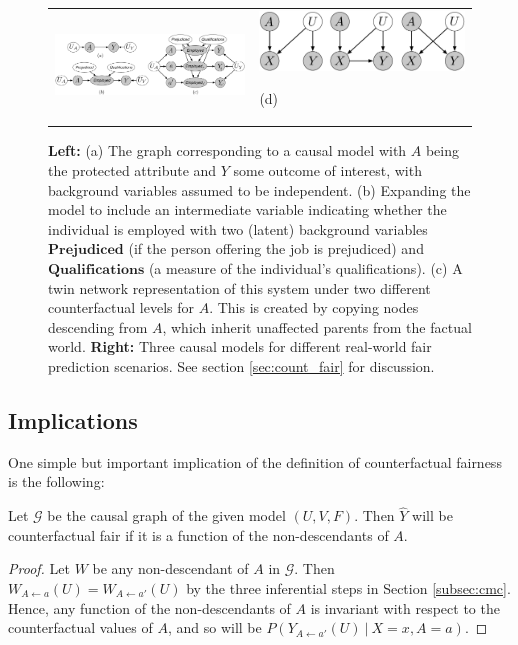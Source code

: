 \begin{figure}
  \begin{tabular}{p{}|p{}}
    \centerline{\includegraphics[width=0.5\columnwidth]{implications_fig.pdf}}&
    \centerline{\includegraphics[width=0.5\columnwidth]{simple_models_no_q3}}(d)
  \end{tabular}
  \caption{\label{fig:ex1} {\bf Left:} (a) The graph corresponding to
    a causal model with $A$ being the protected attribute and $Y$ some
    outcome of interest, with background variables assumed to be
    independent.  (b) Expanding the model to include an intermediate
    variable indicating whether the individual is employed with two
    (latent) background variables $\textbf{Prejudiced}$ (if the person
    offering the job is prejudiced) and $\textbf{Qualifications}$ (a
    measure of the individual's qualifications). (c) A twin network
    representation of this system \citep{pearl:00} under two different
    counterfactual levels for $A$. This is created by copying nodes
    descending from $A$, which inherit unaffected parents from the
    factual world. {\bf Right:} Three causal models for different
    real-world fair prediction scenarios.\label{figure.simple_models}
    See section \ref{sec:count_fair} for discussion.}
\end{figure}

\subsection{Implications}
%
One simple but important implication of the definition of counterfactual fairness is the following:
%
\begin{lem}
  Let $\mathcal G$ be the causal graph of the given model $(U, V, F)$.
  Then $\hat Y$ will be counterfactual fair if it is a function
  of the non-descendants of $A$.
\end{lem}
%
\begin{proof}
 Let $W$ be any non-descendant of $A$ in $\mathcal G$. Then $W_{A
   \leftarrow a}(U) = W_{A \leftarrow a'}(U)$ by the three inferential
 steps in Section \ref{subsec:cmc}.  Hence, any function of the
 non-descendants of $A$ is invariant with respect to the
 counterfactual values of $A$, and so will be $P(Y_{A \leftarrow
   a'}(U)\ |\ X = x, A = a)$.
\end{proof}

